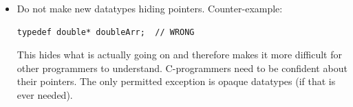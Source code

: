\documentclass[10pt,a4paper]{article}
\begin{document}
\begin{itemize}
	\item Do not make new datatypes hiding pointers. Counter-example:
	\begin{lstlisting}
typedef double* doubleArr;	// WRONG
	\end{lstlisting}
	This hides what is actually going on and therefore makes it more difficult for other programmers to understand. C-programmers need to be confident about their pointers. The only permitted exception is opaque datatypes (if that is ever needed).
\end{itemize}

%
%
%
\end{document}
